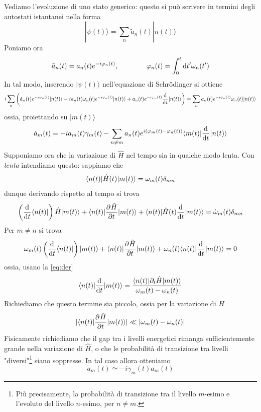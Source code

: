 \documentclass[a4paper, 11pt]{article}
\newcommand{\ham}{\hat{H}}
\renewcommand{\ket}[1]{| #1\rangle}
\renewcommand{\bra}[1]{\langle #1|}
\begin{document}
Vediamo l'evoluzione di uno stato generico: questo si può scrivere in termini degli autostati istantanei nella forma
\[\ket{\psi(t)}=\sum_{n}\tilde{a}_n(t)\ket{n(t)}\]
Poniamo ora
\[\tilde{a}_n(t)=a_n(t)e^{-i\varphi_n(t)},\qquad\qquad\varphi_n(t)=\int_{0}^{t}\mathrm{d} t'\omega_n(t')\]
In tal modo, inserendo $\ket{\psi(t)}$ nell'equazione di Schr\"odinger si ottiene
\[i\sum_{n}\left(\dot{a}_n(t)e^{-i\varphi_n(t)}\ket{n(t)}-i{a}_n(t)\omega_n(t)e^{-i\varphi_n(t)}\ket{n(t)}+{a}_n(t)e^{-i\varphi_n(t)}\der{}{t}\ket{n(t)}\right)=\sum_{n}{a}_n(t)e^{-i\varphi_n(t)}\omega_n(t)\ket{n(t)}\]
ossia, proiettando su $\ket{m(t)}$
\[\dot{a}_m(t)=-ia_m(t)\gamma_m(t)-\sum_{n\neq m}a_n(t)e^{i(\varphi_m(t)-\varphi_n(t))}\bra {m(t)}\der{}{t}\ket{n(t)}\]
Supponiamo ora che la variazione di $\ham$ nel tempo sia in qualche modo lenta. Con \emph{lenta} intendiamo questo: sappiamo che
\[\braketop{n(t)}{\ham(t)}{m(t)}=\omega_m(t)\delta_{mn}\]
dunque derivando rispetto al tempo si trova
\[\left(\der{}{t}\bra {n(t)}\right)\ham\ket{m(t)}+\braketop{n(t)}{\pder{\ham}{t}}{m(t)}+\braketop{n(t)}{\ham(t)\der{}{t}}{m(t)}=\dot{\omega}_m(t)\delta_{mn}\]
Per $m\neq n$ si trova
\[\omega_m(t)\left(\der{}{t}\bra{n(t)}\right)\ket{m(t)}+\braketop{n(t)}{\pder{\ham}{t}}{m(t)}+\omega_n(t)\braketop{n(t)}{\der{}{t}}{m(t)}=0\]
ossia, usano la \ref{eq:der}
\[\braketop{n(t)}{\der{}{t}}{m(t)}=\frac{\braketop{n(t)}{\partial_t\ham}{m(t)}}{\omega_m(t)-\omega_n(t)}\]
Richiediamo che questo termine sia piccolo, ossia per la variazione di $\ham$
\[|\braketop{n(t)}{\pder{\ham}{t}}{m(t)}|\ll|\omega_m(t)-\omega_n(t)|\]
Fisicamente richiediamo che il gap tra i livelli energetici rimanga sufficientemente grande nella variazione di $\ham$, o che le probabilità di transizione tra livelli "diversi"\footnote{Più precisamente, la probabilità di transizione tra il livello $m$-esimo e l'evoluto del livello $n$-esimo, per $n\neq m$.} siano soppresse. In tal caso allora otteniamo
\[\dot{a}_m(t)\simeq-i\gamma_m(t)a_m(t)\]
\end{document}
